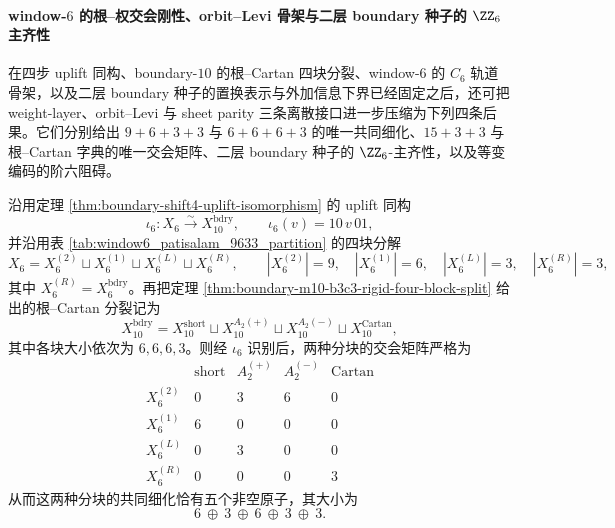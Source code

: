 \paragraph{window-\texorpdfstring{$6$}{6} 的根--权交会刚性、orbit--Levi 骨架与二层 boundary 种子的 \texorpdfstring{$\ZZ_6$}{Z6} 主齐性}
在四步 uplift 同构、boundary-\(10\) 的根--Cartan 四块分裂、window-\(6\) 的 \(C_6\) 轨道骨架，以及二层 boundary 种子的置换表示与外加信息下界已经固定之后，还可把 weight-layer、orbit--Levi 与 sheet parity 三条离散接口进一步压缩为下列四条后果。它们分别给出 \(9+6+3+3\) 与 \(6+6+6+3\) 的唯一共同细化、\(15+3+3\) 与根--Cartan 字典的唯一交会矩阵、二层 boundary 种子的 \(\ZZ_6\)-主齐性，以及等变编码的阶六阻碍。

\begin{theorem}[根--权双分块的五原子共同细化]\label{thm:xi-time-part53da-root-weight-common-refinement-five-atoms}
沿用定理 \ref{thm:boundary-shift4-uplift-isomorphism} 的 uplift 同构
\[
\iota_6:X_6\xrightarrow{\sim}X_{10}^{\mathrm{bdry}},
\qquad
\iota_6(v)=10\,v\,01,
\]
并沿用表 \ref{tab:window6_patisalam_9633_partition} 的四块分解
\[
X_6=X_6^{(2)}\sqcup X_6^{(1)}\sqcup X_6^{(L)}\sqcup X_6^{(R)},
\qquad
|X_6^{(2)}|=9,\quad |X_6^{(1)}|=6,\quad |X_6^{(L)}|=3,\quad |X_6^{(R)}|=3,
\]
其中 \(X_6^{(R)}=X_6^{\mathrm{bdry}}\)。再把定理 \ref{thm:boundary-m10-b3c3-rigid-four-block-split} 给出的根--Cartan 分裂记为
\[
X_{10}^{\mathrm{bdry}}
=
X_{10}^{\mathrm{short}}
\sqcup
X_{10}^{A_2(+)}
\sqcup
X_{10}^{A_2(-)}
\sqcup
X_{10}^{\mathrm{Cartan}},
\]
其中各块大小依次为 \(6,6,6,3\)。则经 \(\iota_6\) 识别后，两种分块的交会矩阵严格为
\[
\begin{array}{c|cccc}
& \mathrm{short} & A_2^{(+)} & A_2^{(-)} & \mathrm{Cartan}\\
\hline
X_6^{(2)} & 0 & 3 & 6 & 0\\
X_6^{(1)} & 6 & 0 & 0 & 0\\
X_6^{(L)} & 0 & 3 & 0 & 0\\
X_6^{(R)} & 0 & 0 & 0 & 3
\end{array}
\]
从而这两种分块的共同细化恰有五个非空原子，其大小为
\[
6\ \oplus\ 3\ \oplus\ 6\ \oplus\ 3\ \oplus\ 3.
\]
\end{theorem}
